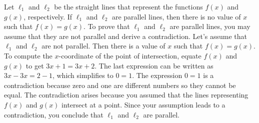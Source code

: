 \documentclass[a4paper,oneside,12pt]{article}
\begin{document}
\begin{solution}
Let $\ell_1$ and $\ell_2$ be the straight lines that represent the
functions $f(x)$ and $g(x)$, respectively.  If $\ell_1$ and $\ell_2$
are parallel lines, then there is no value of $x$ such that
$f(x) = g(x)$.  To prove that $\ell_1$ and $\ell_2$ are parallel
lines, you may assume that they are not parallel and derive a
contradiction.  Let's assume that $\ell_1$ and $\ell_2$ are not
parallel.  Then there is a value of $x$ such that $f(x) = g(x)$.  To
compute the $x$-coordinate of the point of intersection, equate $f(x)$
and $g(x)$ to get $3x + 1 = 3x + 2$.  The last expression can be
written as $3x - 3x = 2 - 1$, which simplifies to $0 = 1$.  The
expression $0 = 1$ is a contradiction because zero and one are
different numbers so they cannot be equal.  The contradiction arises
because you assumed that the lines representing $f(x)$ and $g(x)$
intersect at a point.  Since your assumption leads to a contradiction,
you conclude that $\ell_1$ and $\ell_2$ are parallel.
\end{solution}
\end{document}
